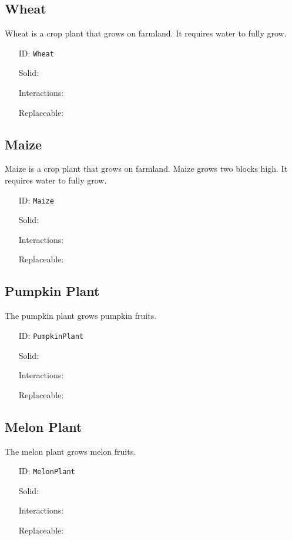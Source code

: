 \subsection{Wheat}\label{subsec:blocks_wheat}
Wheat is a crop plant that grows on farmland. It requires water to fully grow.
\newline
\begin{itemize}[nosep]
    \item[ID:] \texttt{Wheat}
    \item[Solid:]  \XSolidBrush \item[Interactions:]  \XSolidBrush \item[Replaceable:]  \XSolidBrush
\end{itemize}

\subsection{Maize}\label{subsec:blocks_maize}
Maize is a crop plant that grows on farmland.
Maize grows two blocks high. It requires water to fully grow.
\newline
\begin{itemize}[nosep]
    \item[ID:] \texttt{Maize}
    \item[Solid:]  \XSolidBrush \item[Interactions:]  \XSolidBrush \item[Replaceable:]  \XSolidBrush
\end{itemize}

\subsection{Pumpkin Plant}\label{subsec:blocks_pumpkin plant}
The pumpkin plant grows pumpkin fruits.
\newline
\begin{itemize}[nosep]
    \item[ID:] \texttt{PumpkinPlant}
    \item[Solid:]  \XSolidBrush \item[Interactions:]  \XSolidBrush \item[Replaceable:]  \XSolidBrush
\end{itemize}

\subsection{Melon Plant}\label{subsec:blocks_melon plant}
The melon plant grows melon fruits.
\newline
\begin{itemize}[nosep]
    \item[ID:] \texttt{MelonPlant}
    \item[Solid:]  \XSolidBrush \item[Interactions:]  \XSolidBrush \item[Replaceable:]  \XSolidBrush
\end{itemize}

